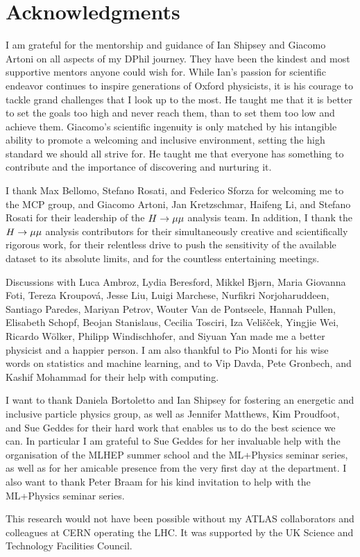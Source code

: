\chapter*{Acknowledgments}

I am grateful for the mentorship and guidance of Ian Shipsey and Giacomo Artoni
on all aspects of my DPhil journey. They have been the kindest and most
supportive mentors anyone could wish for. While Ian's passion for
scientific endeavor continues to inspire generations of Oxford physicists,
it is his courage to tackle grand challenges that I look up to the most. He
taught me that it is better to set the goals too high and never reach them, than to
set them too low and achieve them. Giacomo's scientific ingenuity is
only matched by his intangible ability to promote a welcoming and inclusive
environment, setting the high standard we should all strive for. He taught me
that everyone has something to contribute and the importance of discovering 
and nurturing it.

I thank Max Bellomo, Stefano Rosati, and Federico Sforza for welcoming me to the MCP
group, and Giacomo Artoni, Jan Kretzschmar, Haifeng Li, and Stefano Rosati
for their leadership of the $H \rightarrow \mu\mu$ analysis team. In addition, I thank the $H \rightarrow \mu\mu$
analysis contributors for their simultaneously creative and scientifically rigorous work,
for their relentless drive to push the sensitivity of the available dataset to its absolute limits,
and for the countless entertaining meetings.

Discussions with Luca Ambroz, Lydia Beresford, Mikkel Bj{\o}rn, Maria Giovanna Foti,
Tereza Kroupov\'a, Jesse Liu, Luigi Marchese,
Nurfikri Norjoharuddeen, Santiago Paredes, Mariyan Petrov, Wouter Van de Pontseele,
Hannah Pullen, Elisabeth Schopf, Beojan Stanislaus, Cecilia Tosciri,
Iza Veli\v{s}\v{c}ek, Yingjie Wei, Ricardo W\"olker, Philipp Windischhofer,
and Siyuan Yan made me a better physicist
and a happier person. I am also thankful to Pio Monti for his wise
words on statistics and machine learning, and to Vip Davda, Pete Gronbech, and
Kashif Mohammad for their help with computing.

I want to thank Daniela Bortoletto and Ian Shipsey for fostering an energetic
and inclusive particle physics group, as well as Jennifer Matthews, Kim Proudfoot,
and Sue Geddes for their hard work that enables us to do the best science we can.
In particular I am grateful to Sue Geddes for her invaluable help with the
organisation of the MLHEP summer school and the ML+Physics seminar series,
as well as for her amicable presence from the very first day at the department. I
also want to thank Peter Braam for his kind invitation to help with the
ML+Physics seminar series.

This research would not have been possible without my ATLAS collaborators
and colleagues at CERN operating the LHC. It was supported by the UK Science and
Technology Facilities Council.

\thispagestyle{empty}
